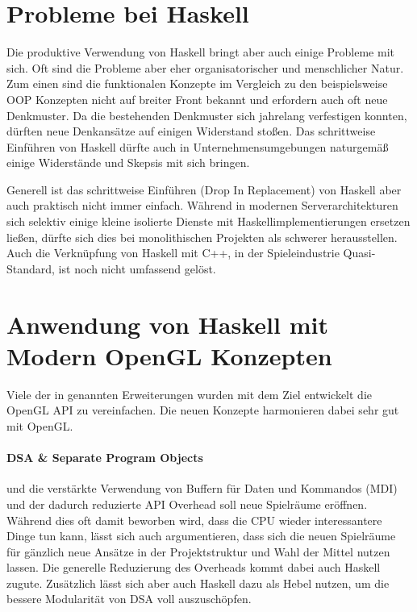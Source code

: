 \section{Probleme bei Haskell}

Die produktive Verwendung von Haskell bringt aber auch einige Probleme mit sich. Oft sind die Probleme aber eher organisatorischer und menschlicher Natur. Zum einen sind die funktionalen Konzepte im Vergleich zu den beispielsweise OOP Konzepten nicht auf breiter Front bekannt und erfordern auch oft neue Denkmuster. Da die bestehenden Denkmuster sich jahrelang verfestigen konnten, dürften neue Denkansätze auf einigen Widerstand stoßen. Das schrittweise Einführen von Haskell dürfte auch in Unternehmensumgebungen naturgemäß einige Widerstände und Skepsis mit sich bringen.

Generell ist das schrittweise Einführen (Drop In Replacement) von Haskell aber auch praktisch nicht immer einfach. Während in modernen Serverarchitekturen sich selektiv einige kleine isolierte Dienste mit Haskellimplementierungen ersetzen ließen, dürfte sich dies bei monolithischen Projekten als schwerer herausstellen. Auch die Verknüpfung von Haskell mit C++, in der Spieleindustrie Quasi-Standard, ist noch nicht umfassend gelöst.


\begingroup
\setlength\intextsep{0pt}
\section{Anwendung von Haskell mit Modern OpenGL Konzepten}

Viele der in  genannten Erweiterungen wurden mit dem Ziel entwickelt die OpenGL API zu vereinfachen. Die neuen Konzepte harmonieren dabei sehr gut mit OpenGL.

\paragraph{\acl{DSA} \& Separate Program Objects} und die verstärkte Verwendung von Buffern für Daten und Kommandos (\ac{MDI}) und der dadurch reduzierte API Overhead soll neue Spielräume eröffnen. Während dies oft damit beworben wird, dass die CPU wieder interessantere Dinge tun kann, lässt sich auch argumentieren, dass sich die neuen Spielräume für gänzlich neue Ansätze in der Projektstruktur und Wahl der Mittel nutzen lassen. Die generelle Reduzierung des Overheads kommt dabei auch Haskell zugute. Zusätzlich lässt sich aber auch Haskell dazu als Hebel nutzen, um die bessere Modularität von \ac{DSA} voll auszuschöpfen.

